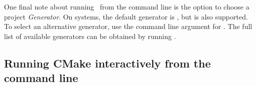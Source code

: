 One final note about running \cmake\ from the command line is the option to choose a project {\it Generator}.  On  systems, the default generator is , but  is also supported.  To select an alternative generator, use the  command line argument for \cmake.  The full list of available generators can be obtained by running .

\subsection{Running CMake interactively from the command line}
\label{sec:running_configure_ccmake}

